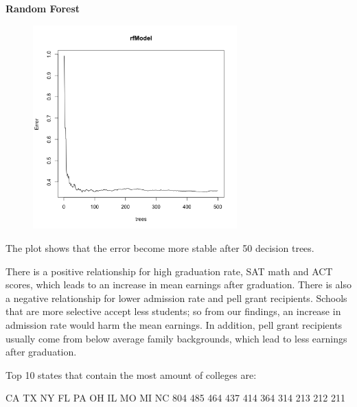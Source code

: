 \documentclass{article}
\begin{document}
\clearpage

\noindent \textbf{Random Forest}\newline

\begin{figure}[H]
\includegraphics[width=0.7\textwidth]{../images/rf_top.png}
\end{figure}
\noindent The plot shows that the error become more stable after 50 decision trees.


There is a positive relationship for high graduation rate, SAT math and ACT scores, which leads to an increase in mean earnings after graduation.  There is also a negative relationship for lower admission rate and pell grant recipients.  Schools that are more selective accept less students; so from our findings, an increase in admission rate would harm the mean earnings.  In addition, pell grant recipients usually come from below average family backgrounds, which lead to less earnings after graduation. 

\clearpage
\noindent Top 10 states that contain the most amount of colleges are:
\begin{Schunk}
\begin{Soutput}
 CA  TX  NY  FL  PA  OH  IL  MO  MI  NC 
804 485 464 437 414 364 314 213 212 211 
\end{Soutput}
\end{Schunk}
\end{document}

